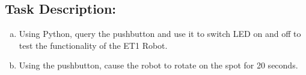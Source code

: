 

\subsection*{\Large Task Description:}
     \begin{enumerate}[a)]
        \item Using Python, query the pushbutton and use it to switch LED on and off to test the 
        functionality of the ET1 Robot. 
        
     
        \item Using the pushbutton, cause the robot to rotate on the spot for 20 seconds.
        
    \end{enumerate}